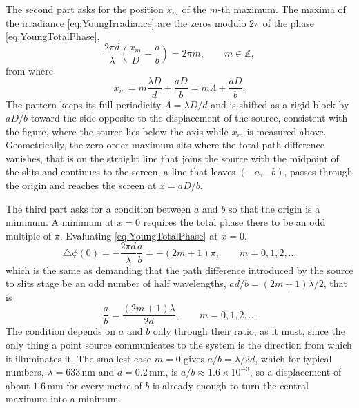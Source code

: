         The second part asks for the position $x_m$ of the $m$-th maximum. The maxima of the irradiance \ref{eq:YoungIrradiance} are the zeros modulo $2\pi$ of the phase \ref{eq:YoungTotalPhase},
        \begin{equation}
            \frac{2\pi d}{\lambda}\left(\frac{x_m}{D} - \frac{a}{b}\right) = 2\pi m, \qquad m\in\mathbb{Z},
        \end{equation}
        from where
        \begin{equation}\label{eq:YoungXm}
            x_m = m\frac{\lambda D}{d} + \frac{aD}{b} = m\Lambda + \frac{aD}{b}.
        \end{equation}
        The pattern keeps its full periodicity $\Lambda = \lambda D/d$ and is shifted as a rigid block by $aD/b$ toward the side opposite to the displacement of the source, consistent with the figure, where the source lies below the axis while $x_m$ is measured above. Geometrically, the zero order maximum sits where the total path difference vanishes, that is on the straight line that joins the source with the midpoint of the slits and continues to the screen, a line that leaves $(-a,-b)$, passes through the origin and reaches the screen at $x = aD/b$.

        The third part asks for a condition between $a$ and $b$ so that the origin is a minimum. A minimum at $x=0$ requires the total phase there to be an odd multiple of $\pi$. Evaluating \ref{eq:YoungTotalPhase} at $x=0$,
        \begin{equation}
            \triangle\phi(0) = -\frac{2\pi d}{\lambda}\frac{a}{b} = -(2m+1)\pi, \qquad m = 0,1,2,\dots
        \end{equation}
        which is the same as demanding that the path difference introduced by the source to slits stage be an odd number of half wavelengths, $ad/b = (2m+1)\lambda/2$, that is
        \begin{equation}\label{eq:YoungMinCondition}
            \frac{a}{b} = \frac{(2m+1)\lambda}{2d}, \qquad m = 0,1,2,\dots
        \end{equation}
        The condition depends on $a$ and $b$ only through their ratio, as it must, since the only thing a point source communicates to the system is the direction from which it illuminates it. The smallest case $m=0$ gives $a/b = \lambda/2d$, which for typical numbers, $\lambda = 633\,\text{nm}$ and $d = 0.2\,\text{mm}$, is $a/b \approx 1.6\times 10^{-3}$, so a displacement of about $1.6\,\text{mm}$ for every metre of $b$ is already enough to turn the central maximum into a minimum.

